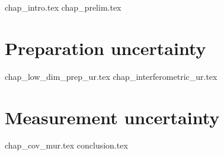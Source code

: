\documentclass[a4paper,11pt,leqno]{memoir} %
\newcommand{\clearemptydoublepage}{\newpage{\thispagestyle{empty}\cleardoublepage}}
\theoremstyle{plain}
\theoremstyle{plain}
\theoremstyle{plain}
\theoremstyle{definition}
\theoremstyle{plain}
\theoremstyle{plain}
\theoremstyle{plain}
\numberwithin{equation}{section}
\begin{document}
%


\frontmatter
%


\clearemptydoublepage
%
%
\setcounter{page}{3}

\clearemptydoublepage
%
\renewcommand{\contentsname}{List of Contents}
\tableofcontents*
\clearemptydoublepage
%
%
\listoffigures
{}
\clearemptydoublepage
%

%

\clearemptydoublepage
%

\clearemptydoublepage
\savepagenumber

%
% 
\mainmatter
\restorepagenumber
%
{chap_intro.tex}
\clearemptydoublepage
{chap_prelim.tex}
\clearemptydoublepage
\part{Preparation uncertainty}\label{part:prep-ur}
{chap_low_dim_prep_ur.tex}
{chap_interferometric_ur.tex}
\clearemptydoublepage
\part{Measurement uncertainty}\label{part:meas-ur}
{chap_cov_mur.tex}
\clearemptydoublepage
{conclusion.tex}
\clearemptydoublepage
\printbibliography
   
\end{document}
